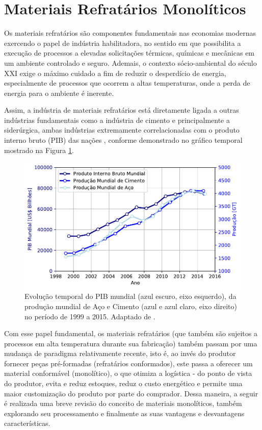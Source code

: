 
\section{Materiais Refratários Monolíticos}\label{mono}

Os materiais refratários são componentes fundamentais nas economias modernas
exercendo o papel de indústria habilitadora, no sentido em que possibilita a
execução de processos a elevadas solicitações térmicas, químicas e mecânicas em
um ambiente controlado e seguro. Ademais, o contexto sócio-ambiental do século
XXI exige o máximo cuidado a fim de reduzir o desperdício de energia,
especialmente de processos que ocorrem a altas temperaturas, onde a perda de
energia para o ambiente é inerente.

Assim, a indústria de materiais refratários está diretamente ligada a outras
indústrias fundamentais como a indústria de cimento e principalmente a
siderúrgica, ambas indústrias extremamente correlacionadas com o produto interno
bruto (PIB) das nações \cite{Ravazzolo2017, Bordigoni2016, Dobrota2013} ,
conforme demonstrado no gráfico temporal mostrado na Figura
\ref{fig:refractory_economy}.

\begin{figure}[!ht]
\centering
\includegraphics[width=\linewidth]{./figures/refractory_economy.pdf}
\caption{Evolução temporal do PIB mundial (azul escuro, eixo esquerdo), da
  produção mundial de Aço e Cimento (azul e azul claro, eixo direito) no período
  de 1999 a 2015. Adaptado de
  \cite{GlobalRef2017}. \label{fig:refractory_economy}}
\end{figure}

Com esse papel fundamental, os materiais refratários (que também são sujeitos a
processos em alta temperatura durante sua fabricação) também passam por uma
mudança de paradigma relativamente recente, isto é, ao invés do produtor
fornecer peças pré-formadas (refratários conformados), este passa a oferecer um
material conformável (monolítico), o que otimiza a logística - do ponto de vista
do produtor, evita e reduz estoques, reduz o custo energético e permite uma
maior customização do produto por parte do comprador. Dessa maneira, a seguir é
realizada uma breve revisão do conceito de materiais monolíticos, também
explorando seu processamento e finalmente as suas vantagens e desvantagens
características.

